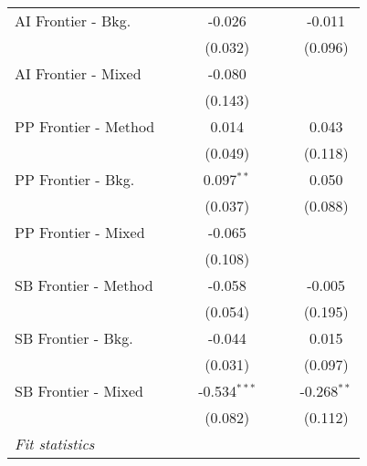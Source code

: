 \begin{tabular}{lcccccc}
   AI Frontier - Bkg.   &               &               & -0.026         &               &               & -0.011\\   
                        &               &               & (0.032)        &               &               & (0.096)\\   
   AI Frontier - Mixed  &               &               & -0.080         &               &               &   \\   
                        &               &               & (0.143)        &               &               &   \\   
   PP Frontier - Method &               &               & 0.014          &               &               & 0.043\\   
                        &               &               & (0.049)        &               &               & (0.118)\\   
   PP Frontier - Bkg.   &               &               & 0.097$^{**}$   &               &               & 0.050\\   
                        &               &               & (0.037)        &               &               & (0.088)\\   
   PP Frontier - Mixed  &               &               & -0.065         &               &               &   \\   
                        &               &               & (0.108)        &               &               &   \\   
   SB Frontier - Method &               &               & -0.058         &               &               & -0.005\\   
                        &               &               & (0.054)        &               &               & (0.195)\\   
   SB Frontier - Bkg.   &               &               & -0.044         &               &               & 0.015\\   
                        &               &               & (0.031)        &               &               & (0.097)\\   
   SB Frontier - Mixed  &               &               & -0.534$^{***}$ &               &               & -0.268$^{**}$\\   
                        &               &               & (0.082)        &               &               & (0.112)\\   
   \midrule
   \emph{Fit statistics}\\

\end{tabular}
